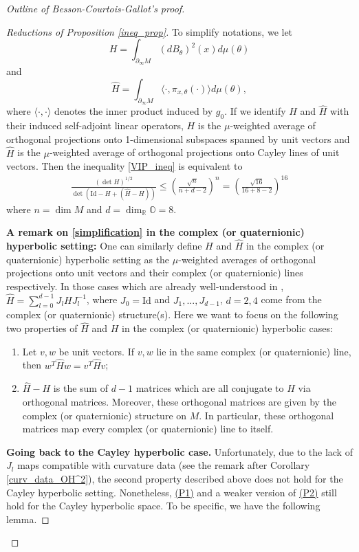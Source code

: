 \documentclass{article}
\newcommand{\OO}{\mathbb{O}}
\newcommand{\RR}{\mathbb{R}}
\newcommand{\del}{\partial}
\newcommand{\id}{\mathrm{Id}}
\theoremstyle{definition}
\begin{document}
\begin{proof}[Outline of Besson-Courtois-Gallot's proof]
\begin{proof}[Reductions of Proposition \ref{ineq_prop}]
To simplify notations, we let
$$H=\int_{\del_\infty M}(dB_\theta)^2(x)d\mu(\theta)$$
and 
$$\widehat{H}=\int_{\del_\infty M}\langle\cdot,\pi_{x,\theta}(\cdot)\rangle d\mu(\theta),$$
where $\langle\cdot,\cdot\rangle$ denotes the inner product induced by $g_0$. If we identify $H$ and $\widehat H$ with their induced self-adjoint linear operators, $H$ is the $\mu$-weighted average of orthogonal projections onto 1-dimensional subspaces spanned by unit vectors and $\widehat H$ is  the $\mu$-weighted average of orthogonal projections onto Cayley lines of unit vectors. Then the inequality \eqref{VIP_ineq} is equivalent to
\begin{align}\label{simplification}
\frac{(\det H)^{1/2}}{\det \left(\id-H+(\widehat{H}-H)\right)}\leq\left(\frac{\sqrt{n}}{n+d-2}\right)^{n}= \left(\frac{\sqrt{16}}{16+8-2}\right)^{16}
\end{align}
where $n=\dim M$ and $d=\dim_\RR\OO=8$. 

\textbf{A remark on \eqref{simplification} in the complex (or quaternionic) hyperbolic setting:} One can similarly define $H$ and $\widehat H$ in the complex (or quaternionic) hyperbolic setting as  the $\mu$-weighted averages of orthogonal projections onto unit vectors and their complex (or quaternionic) lines respectively. In those cases which are already well-understood in \cite[Appendice B]{BCG1}, $\widehat H=\sum_{l=0}^{d-1}J_lHJ_l^{-1}$, where $J_0=\id$ and $J_1,...,J_{d-1}$, $d=2,4$ come from the complex (or quaternionic) structure(s). Here we want to focus on the following two properties of $\widehat H$ and $H$ in the complex (or quaternionic) hyperbolic cases:
\begin{enumerate}
\item[\hypertarget{P1}{(P1).}] Let $v,w$ be unit vectors. If $v,w$ lie in the same complex (or quaternionic) line, then $w^T\widehat H w= v^T\widehat H v$;
\item[\hypertarget{P2}{(P2).}] $\widehat H-H$ is the sum of $d-1$ matrices which are all conjugate to $H$ via orthogonal matrices. Moreover, these orthogonal matrices are given by the complex (or quaternionic) structure on $M$. In particular, these orthogonal matrices map every complex (or quaternionic) line to itself.
\end{enumerate} 

\textbf{Going back to the Cayley hyperbolic case.} Unfortunately, due to the lack of $J_l$ maps compatible with curvature data (see the remark after Corollary \ref{curv_data_OH^2}), the second property described above does not hold for the Cayley hyperbolic setting. Nonetheless, \hyperlink{P1}{(P1)} and a weaker version of \hyperlink{P2}{(P2)} still hold for the Cayley hyperbolic space. To be specific, we have the following lemma.



\end{proof}
\end{proof}
\end{document}

